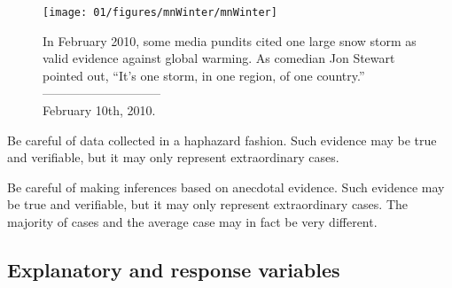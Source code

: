 \setlength{\captionwidth}{\textwidth-80mm}
\begin{figure}
\centering
\hspace{8mm}\texttt{[image: 01/figures/mnWinter/mnWinter]}\hspace{4mm}
\begin{minipage}[b]{\textwidth - 80mm}
   \caption[anecdotal evidence]{In February 2010, some media pundits cited one large snow storm as valid evidence against global warming. As comedian Jon Stewart pointed out, ``It's one storm, in one region, of one country.''\vspace{-4.5mm} \\
   
   -----------------------------\vspace{-2mm}\\
   {\footnotesize February 10th, 2010.}
   \label{mnWinter}}
\end{minipage}
\end{figure}
\setlength{\captionwidth}{\mycaptionwidth}

\begin{termBox}{
Be careful of data collected in a haphazard fashion. Such evidence may be true and verifiable, but it may only represent extraordinary cases.}
\end{termBox}


\begin{termBox}{
Be careful of making inferences based on anecdotal evidence. Such evidence may be true and verifiable, but it may only represent extraordinary cases. The majority of cases and the average case may in fact be very different.}
\end{termBox}



\subsection{Explanatory and response variables}
\label{explanatoryAndResponse}

